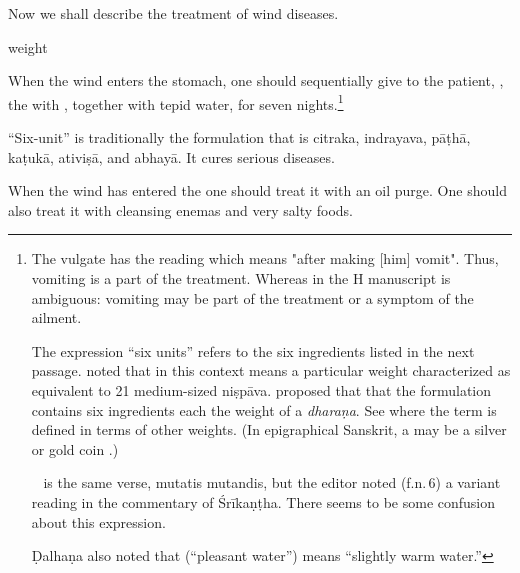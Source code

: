 \begin{translation}
    
    \item [1] 
    Now we shall describe the treatment of wind diseases.
    
    weight

    \item [3] 
    
    When the wind enters the stomach, one should sequentially give to
the patient, , the  with
,  together with tepid water, for seven
nights.\footnote{The vulgate has the reading  which means
    "after making [him] vomit". Thus, vomiting is a part of the treatment.
    Whereas  in the H manuscript is ambiguous:  vomiting may be 
    part of the treatment or a symptom of the ailment.
    
The expression “six units” refers to the six ingredients listed in the
next passage.   noted that  in this
context means a particular weight characterized as equivalent to 21
medium-sized \gls{niṣpāva}.  \citet[303]{shar-1999} proposed that that
the formulation contains six ingredients each the weight of a
\emph{dharaṇa}.  See  where the term  is
defined in terms of other weights.  (In epigraphical Sanskrit, a
 may be a silver or gold coin \citep[91]{sirc-1966}.)

 \AH\  is the same verse, mutatis mutandis, but the editor 
 noted 
 (f.n.\,6) a variant reading  in the commentary of Śrīkaṇṭha.  
 There seems to be some confusion about this expression.

Ḍalhaṇa also noted that  (“pleasant water”) means “slightly 
warm water.”}

    \item [4]
    
    “Six-unit” is traditionally the formulation that is 
\gls{citraka}, \gls{indrayava}, \gls{pāṭhā},
\gls{kaṭukā}, \gls{ativiṣā}, and \gls{abhayā}. It cures serious
diseases.



    \item [5]
    When the wind has entered the  one should treat it 
    with an oil purge. One should also treat it with cleansing enemas and very 
    salty foods.




\end{translation}
